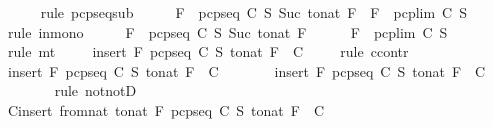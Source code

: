 \begin{isabellebody}
\ \ \ \ \isamarkupfalse%
\ {\isacharparenleft}rule\ pcp{\isacharunderscore}seq{\isacharunderscore}sub{\isacharparenright}\isanewline
\ \ \isamarkupfalse%
\ \isamarkupfalse%
\ {\isachardoublequoteopen}F\ {\isasymin}\ pcp{\isacharunderscore}seq\ C\ S\ {\isacharparenleft}Suc\ {\isacharparenleft}to{\isacharunderscore}nat\ F{\isacharparenright}{\isacharparenright}\ {\isasymlongrightarrow}\ F\ {\isasymin}\ pcp{\isacharunderscore}lim\ C\ S{\isachardoublequoteclose}\isanewline
\ \ \ \ \isamarkupfalse%
\ {\isacharparenleft}rule\ in{\isacharunderscore}mono{\isacharparenright}\isanewline
\ \ \isamarkupfalse%
\ \isamarkupfalse%
\ {}{\isacharcolon}{\isachardoublequoteopen}F\ {\isasymnotin}\ pcp{\isacharunderscore}seq\ C\ S\ {\isacharparenleft}Suc\ {\isacharparenleft}to{\isacharunderscore}nat\ F{\isacharparenright}{\isacharparenright}{\isachardoublequoteclose}\isanewline
\ \ \ \ \isamarkupfalse%
\ {\isacartoucheopen}F\ {\isasymnotin}\ pcp{\isacharunderscore}lim\ C\ S{\isacartoucheclose}\ \isamarkupfalse%
\ {\isacharparenleft}rule\ mt{\isacharparenright}\isanewline
\ \ \isamarkupfalse%
\ {}{\isacharcolon}\ {\isachardoublequoteopen}insert\ F\ {\isacharparenleft}pcp{\isacharunderscore}seq\ C\ S\ {\isacharparenleft}to{\isacharunderscore}nat\ F{\isacharparenright}{\isacharparenright}\ {\isasymnotin}\ C{\isachardoublequoteclose}\ \isanewline
\ \ \isamarkupfalse%
\ {\isacharparenleft}rule\ ccontr{\isacharparenright}\isanewline
\ \ \ \ \isamarkupfalse%
\ {\isachardoublequoteopen}{\isasymnot}{\isacharparenleft}insert\ F\ {\isacharparenleft}pcp{\isacharunderscore}seq\ C\ S\ {\isacharparenleft}to{\isacharunderscore}nat\ F{\isacharparenright}{\isacharparenright}\ {\isasymnotin}\ C{\isacharparenright}{\isachardoublequoteclose}\isanewline
\ \ \ \ \isamarkupfalse%
\ \isamarkupfalse%
\ {\isachardoublequoteopen}insert\ F\ {\isacharparenleft}pcp{\isacharunderscore}seq\ C\ S\ {\isacharparenleft}to{\isacharunderscore}nat\ F{\isacharparenright}{\isacharparenright}\ {\isasymin}\ C{\isachardoublequoteclose}\isanewline
\ \ \ \ \ \ \isamarkupfalse%
\ {\isacharparenleft}rule\ notnotD{\isacharparenright}\isanewline
\ \ \ \ \isamarkupfalse%
\ \isamarkupfalse%
\ C{\isacharcolon}{\isachardoublequoteopen}insert\ {\isacharparenleft}from{\isacharunderscore}nat\ {\isacharparenleft}to{\isacharunderscore}nat\ F{\isacharparenright}{\isacharparenright}\ {\isacharparenleft}pcp{\isacharunderscore}seq\ C\ S\ {\isacharparenleft}to{\isacharunderscore}nat\ F{\isacharparenright}{\isacharparenright}\ {\isasymin}\ C{\isachardoublequoteclose}\isanewline

\end{isabellebody}

